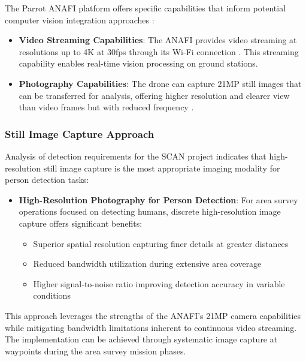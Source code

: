 The Parrot ANAFI platform offers specific capabilities that inform potential computer vision integration approaches \cite{ParrotSDKDoc}:

\begin{itemize}
    \item \textbf{Video Streaming Capabilities}: The ANAFI provides video streaming at resolutions up to 4K at 30fps through its Wi-Fi connection \cite{ParrotANAFISpec}. This streaming capability enables real-time vision processing on ground stations.
    
    \item \textbf{Photography Capabilities}: The drone can capture 21MP still images that can be transferred for analysis, offering higher resolution and clearer view than video frames but with reduced frequency \cite{ParrotANAFISpec}.
\end{itemize}

\subsubsection{Still Image Capture Approach}

Analysis of detection requirements for the SCAN project indicates that high-resolution still image capture is the most appropriate imaging modality for person detection tasks:

\begin{itemize}
    \item \textbf{High-Resolution Photography for Person Detection}: For area survey operations focused on detecting humans, discrete high-resolution image capture offers significant benefits:
    \begin{itemize}
        \item Superior spatial resolution capturing finer details at greater distances \cite{Mueller2019}
        \item Reduced bandwidth utilization during extensive area coverage \cite{Gao2020}
        \item Higher signal-to-noise ratio improving detection accuracy in variable conditions \cite{Wu2019}
    \end{itemize}
\end{itemize}

This approach leverages the strengths of the ANAFI's 21MP camera capabilities while mitigating bandwidth limitations inherent to continuous video streaming. The implementation can be achieved through systematic image capture at waypoints during the area survey mission phases.